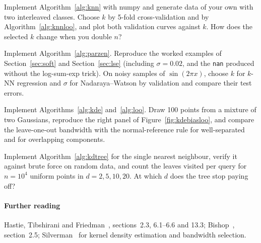 \documentclass[11pt]{article}
\begin{document}
\begin{questions}
\begin{programming}
\item Implement Algorithm~\ref{alg:knn} with numpy and generate data of your own with two interleaved classes.
Choose $k$ by 5-fold cross-validation and by Algorithm~\ref{alg:knnloo}, and plot both validation curves against
$k$. How does the selected $k$ change when you double $n$?
\item Implement Algorithm~\ref{alg:parzen}. Reproduce the worked examples of Section~\ref{sec:soft} and
Section~\ref{sec:lse} (including $\sigma = 0.02$, and the \texttt{nan} produced without the log-sum-exp trick). On
noisy samples of $\sin(2\pi x)$, choose $k$ for $k$-NN regression and $\sigma$ for Nadaraya--Watson by validation and
compare their test errors.
\item Implement Algorithms~\ref{alg:kde} and~\ref{alg:loo}. Draw 100 points from a mixture of two Gaussians,
reproduce the right panel of Figure~\ref{fig:kdebiasloo}, and compare the leave-one-out bandwidth with the
normal-reference rule for well-separated and for overlapping components.
\item Implement Algorithm~\ref{alg:kdtree} for the single nearest neighbour, verify it against brute force on random
data, and count the leaves visited per query for $n = 10^4$ uniform points in $d = 2, 5, 10, 20$. At which $d$ does
the tree stop paying off?
\end{programming}
\end{questions}

\paragraph{Further reading} Hastie, Tibshirani and Friedman~\cite{hastie2009}, sections~2.3, 6.1--6.6 and 13.3;
Bishop~\cite{bishop2006}, section~2.5; Silverman~\cite{silverman1986} for kernel density estimation and bandwidth
selection.
\end{document}
